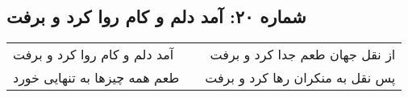 \begin{center}
\section*{شماره ۲۰: آمد دلم و کام روا کرد و برفت}
\label{sec:020}
\begin{longtable}{l p{0.5cm} r}
آمد دلم و کام روا کرد و برفت
&&
از نقل جهان طعم جدا کرد و برفت
\\
طعم همه چیزها به تنهایی خورد
&&
پس نقل به منکران رها کرد و برفت
\\
\end{longtable}
\end{center}
